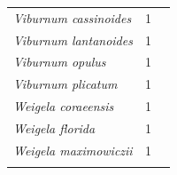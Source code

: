 \documentclass[11pt]{article}
\begin{document}
\begin{longtable}{p{}p{}p{}}
  \emph{Viburnum cassinoides} &   1 & \emph{\citep{flynn2018}} \\ 
  \emph{Viburnum lantanoides} &   1 & \emph{\citep{flynn2018}} \\ 
  \emph{Viburnum opulus} &   1 & \emph{\citep{zohner2016}} \\ 
  \emph{Viburnum plicatum} &   1 & \emph{\citep{zohner2016}} \\ 
  \emph{Weigela coraeensis} &   1 & \emph{\citep{zohner2016}} \\ 
  \emph{Weigela florida} &   1 & \emph{\citep{zohner2016}} \\ 
  \emph{Weigela maximowiczii} &   1 & \emph{\citep{zohner2016}} \\ 
  \hline
\label{tab:ref}
\end{longtable}
\endgroup


\clearpage
\end{document}
